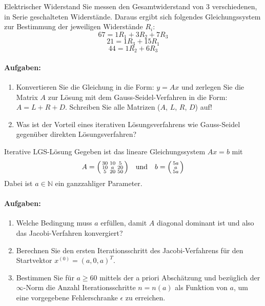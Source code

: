 \begin{example2}{Elektrischer Widerstand}
Sie messen den Gesamtwiderstand von 3 verschiedenen, in Serie geschalteten Widerstände. Daraus ergibt sich folgendes Gleichungssystem zur Bestimmung der jeweiligen Widerstände $R_i$:
$$67 = 1R_1 + 3R_2 + 7R_3$$
$$21 = 1R_3 + 15R_1$$
$$44 = 1R_2 + 6R_3$$

\paragraph{Aufgaben:}
\begin{enumerate}
    \item Konvertieren Sie die Gleichung in die Form: $y = Ax$ und zerlegen Sie die Matrix $A$ zur Lösung mit dem Gauss-Seidel-Verfahren in die Form: $A = L + R + D$. Schreiben Sie alle Matrizen ($A$, $L$, $R$, $D$) auf!
        
    \item Was ist der Vorteil eines iterativen Lösungsverfahrens wie Gauss-Seidel gegenüber direkten Lösungsverfahren?
\end{enumerate}
\end{example2}

\begin{example2}{Iterative LGS-Lösung}
Gegeben ist das lineare Gleichungssystem $Ax = b$ mit
$$A = \begin{psmallmatrix}
30 & 10 & 5\\
10 & a & 20\\
5 & 20 & 50
\end{psmallmatrix}
\quad \text{und} \quad
b = \begin{psmallmatrix}
5a\\
a\\
5a
\end{psmallmatrix}$$
Dabei ist $a \in \mathbb{N}$ ein ganzzahliger Parameter.

\paragraph{Aufgaben:}
\begin{enumerate}
    \item Welche Bedingung muss $a$ erfüllen, damit $A$ diagonal dominant ist und also das Jacobi-Verfahren konvergiert?
    
    \item Berechnen Sie den ersten Iterationsschritt des Jacobi-Verfahrens für den Startvektor $x^{(0)} = (a,0,a)^T$.
    
    \item Bestimmen Sie für $a \geq 60$ mittels der a priori Abschätzung und bezüglich der $\infty$-Norm die Anzahl Iterationsschritte $n = n(a)$ als Funktion von $a$, um eine vorgegebene Fehlerschranke $\epsilon$ zu erreichen.
\end{enumerate}
\end{example2}


